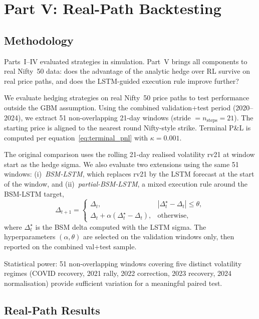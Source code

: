 \documentclass[12pt,a4paper]{article}
\begin{document}
\section{Part V: Real-Path Backtesting}
\label{sec:backtest}

\subsection{Methodology}

Parts~I--IV evaluated strategies in simulation.  Part~V brings all
components to real Nifty~50 data: does the advantage of the analytic hedge
over RL survive on real price paths, and does the LSTM-guided execution
rule improve further?

We evaluate hedging strategies on real Nifty~50 price paths to test
performance outside the GBM assumption.  Using the combined validation+test
period (2020--2024), we extract 51 non-overlapping 21-day windows
(stride $= n_{\mathrm{steps}} = 21$).  The starting price is aligned to
the nearest round Nifty-style strike.  Terminal P\&L is computed per
equation~\eqref{eq:terminal_pnl} with $\kappa=0.001$.

The original comparison uses the rolling 21-day realised volatility rv21 at
window start as the hedge sigma.  We also evaluate two extensions using the
same 51 windows: (i)~\textit{BSM-LSTM}, which replaces rv21 by the LSTM
forecast at the start of the window, and (ii)~\textit{partial-BSM-LSTM}, a
mixed execution rule around the BSM-LSTM target,
\[
  \Delta_{t+1} =
  \begin{cases}
    \Delta_t, & |\Delta_t^{\star}-\Delta_t| \le \theta, \\
    \Delta_t + \alpha(\Delta_t^{\star}-\Delta_t), & \text{otherwise},
  \end{cases}
\]
where $\Delta_t^{\star}$ is the BSM delta computed with the LSTM sigma.
The hyperparameters $(\alpha,\theta)$ are selected on the validation windows
only, then reported on the combined val+test sample.

Statistical power: 51 non-overlapping windows covering five distinct volatility
regimes (COVID recovery, 2021 rally, 2022 correction, 2023 recovery,
2024 normalisation) provide sufficient variation for a meaningful paired test.

\subsection{Real-Path Results}
\end{document}
